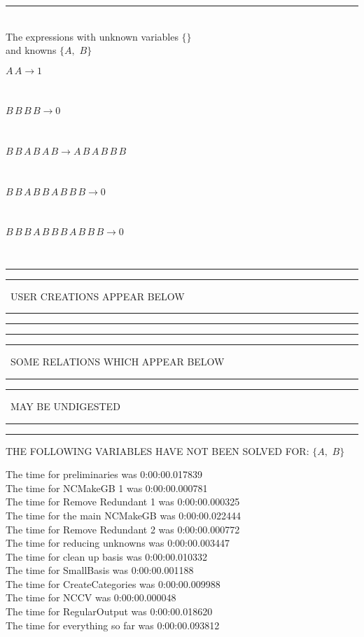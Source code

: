 \documentclass[rep10,leqno]{report}
\begin{document}
\rule[3pt]{6in}{.7pt}\\
The expressions with unknown variables $\{\}$\\
and knowns $\{A,
$ $
B\}$\smallskip\\
\begin{minipage}{6in}
$
A\,
 A\rightarrow 1
$
\end{minipage}\medskip \\
\begin{minipage}{6in}
$
B\,
 B\,
 B\,
 B\rightarrow 0
$
\end{minipage}\medskip \\
\begin{minipage}{6in}
$
B\,
 B\,
 A\,
 B\,
 A\,
 B\rightarrow A\,
 B\,
 A\,
 B\,
 B\,
 B
$
\end{minipage}\medskip \\
\begin{minipage}{6in}
$
B\,
 B\,
 A\,
 B\,
 B\,
 A\,
 B\,
 B\,
 B\rightarrow 0
$
\end{minipage}\medskip \\
\begin{minipage}{6in}
$
B\,
 B\,
 B\,
 A\,
 B\,
 B\,
 B\,
 A\,
 B\,
 B\,
 B\rightarrow 0
$
\end{minipage}\\
\rule[2pt]{6in}{1pt}\hfil\break
\rule[2.5pt]{1.701in}{1pt}
\ USER CREATIONS APPEAR BELOW\ 
\rule[2.5pt]{1.701in}{1pt}\hfil\break
\rule[2pt]{6in}{1pt}\hfil\break
\rule[2pt]{6in}{4pt}\hfil\break
\rule[2pt]{1.45in}{4pt}
\ SOME RELATIONS WHICH APPEAR BELOW\ 
\rule[2pt]{1.45in}{4pt}\hfil\break
\rule[2pt]{2.18in}{4pt}
\ MAY BE UNDIGESTED\ 
\rule[2pt]{2.18in}{4pt}\hfil\break
\rule[2pt]{6in}{4pt}\hfil\break
THE FOLLOWING VARIABLES HAVE NOT BEEN SOLVED FOR:\hfil\break
$\{A,
$ $
B\}$
\smallskip\\
\vspace{10pt}

\noindent
The time for preliminaries was 0:00:00.017839\\
The time for NCMakeGB 1 was 0:00:00.000781\\
The time for Remove Redundant 1 was 0:00:00.000325\\
The time for the main NCMakeGB was 0:00:00.022444\\
The time for Remove Redundant 2 was 0:00:00.000772\\
The time for reducing unknowns was 0:00:00.003447\\
The time for clean up basis was 0:00:00.010332\\
The time for SmallBasis was 0:00:00.001188\\
The time for CreateCategories was 0:00:00.009988\\
The time for NCCV was 0:00:00.000048\\
The time for RegularOutput was 0:00:00.018620\\
The time for everything so far was 0:00:00.093812\\
\end{document}
